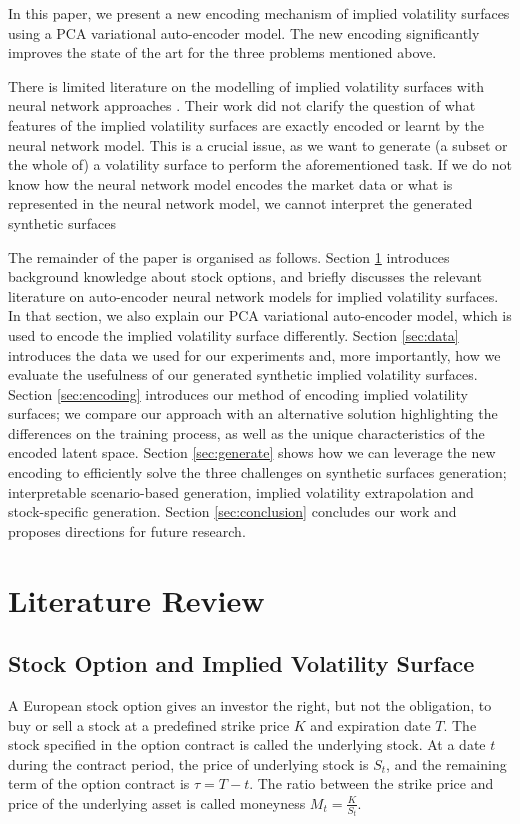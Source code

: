 \documentclass[format=sigconf]{acmart}
\begin{document}
In this paper, we present a new encoding mechanism of implied volatility surfaces using a PCA variational auto-encoder model. The new encoding significantly improves the state of the art %
for the three problems mentioned above.

There is limited literature on the modelling of implied volatility surfaces with neural network approaches \cite{cao2020neural,ackerer2020deep,bergeron2022variational,zheng2019gated}. Their work did not clarify the question of what features of the implied volatility surfaces are exactly encoded or learnt by the neural network model. This is a crucial issue, as we want to generate (a subset or the whole of) a volatility surface to perform the aforementioned task. If we do not know how the neural network model encodes the market data or what is represented in the neural network model, we cannot interpret the generated synthetic surfaces

The remainder of the paper is organised as follows. Section \ref{sec:review} introduces background knowledge about stock options, and briefly discusses the relevant literature on auto-encoder neural network models for implied volatility surfaces. In that section, we also explain our PCA variational auto-encoder model, which is used to encode the implied volatility surface differently. Section \ref{sec:data} introduces the data we used for our experiments and, more importantly, how we evaluate the usefulness of our generated synthetic implied volatility surfaces. Section \ref{sec:encoding} introduces our method of encoding implied volatility surfaces; we compare our approach with an alternative solution highlighting the differences on the training process, as well as the unique characteristics of the encoded latent space. Section \ref{sec:generate} shows how we can leverage the new encoding to efficiently solve the three challenges on synthetic surfaces generation; interpretable scenario-based generation, implied volatility extrapolation and stock-specific generation. Section \ref{sec:conclusion} concludes our work and proposes directions for future research.

\section{Literature Review}
\label{sec:review}
\subsection{Stock Option and Implied Volatility Surface}
A European stock option gives an investor the right, but not the obligation, to buy or sell a stock at a predefined strike price $K$ and expiration date $T$. The stock specified in the option contract is called the underlying stock. At a date $t$ during the contract period, the price of underlying stock is $S_{t}$, and the remaining term of the option contract is $\tau = T - t$. The ratio between the strike price and price of the underlying asset is called moneyness $M_{t} = \frac{K}{S_{t}}$.
\end{document}

